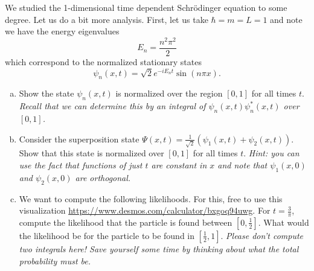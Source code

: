 \documentclass[12pt]{amsbook}
\begin{document}
\newpage
\begin{problem}
We studied the 1-dimensional time dependent Schr\"odinger equation to some degree. Let us do a bit more analysis. First, let us take $\hbar=m=L=1$ and note we have the energy eigenvalues
\[
E_n = \frac{n^2 \pi^2}{2}
\]
which correspond to the normalized stationary states
\[
\psi_n(x,t) = \sqrt{2} e^{-iE_n t} \sin(n\pi x).
\]
\begin{enumerate}[(a)]
\vspace*{0.25cm}
    \item Show the state $\psi_n(x,t)$ is normalized over the region $[0,1]$ for all times $t$. \emph{Recall that we can determine this by an integral of $\psi_n(x,t)\psi_n^*(x,t)$ over $[0,1]$.}
\vspace*{0.25cm}
    \item Consider the superposition state $\Psi(x,t) = \frac{1}{\sqrt{2}}\left( \psi_1(x,t) + \psi_2(x,t) \right)$. Show that this state is normalized over $[0,1]$ for all times $t$. \emph{Hint: you can use the fact that functions of just $t$ are constant in $x$ and note that $\psi_1(x,0)$ and $\psi_2(x,0)$ are orthogonal.}
\vspace*{0.25cm}
    \item We want to compute the following likelihoods. For this, free to use this visualization \url{https://www.desmos.com/calculator/bxgoq94uwg}. For $t=\frac{3}{\pi}$, compute the likelihood that the particle is found between $\left[0,\frac{1}{2}\right]$. What would the likelihood be for the particle to be found in $\left[\frac{1}{2}, 1\right]$. \emph{Please don't compute two integrals here! Save yourself some time by thinking about what the total probability must be.}
\end{enumerate}
\end{problem}
\end{document}
